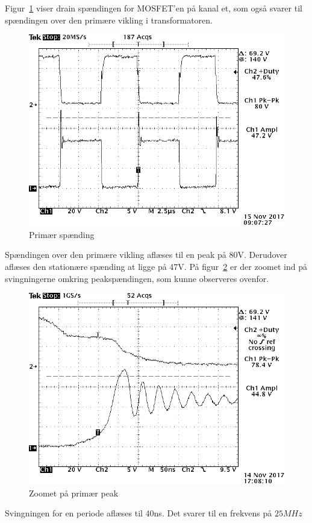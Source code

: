 Figur~\ref{fig: privolt} viser drain spændingen for MOSFET'en på kanal et, som også svarer til spændingen over den primære vikling i transformatoren.
\begin{figure}[H]
	\center
	\includegraphics[max width=0.7\linewidth]{../dokumentation/tex/2iteration/billeder/Realisering/Transformator_Primar.png}
	\caption{Primær spænding}
	\label{fig: privolt}
\end{figure}
Spændingen over den primære vikling aflæses til en peak på 80V. Derudover aflæses den stationære spænding at ligge på 47V. 
På figur~\ref{fig: prizoom} er der zoomet ind på svingningerne omkring peakspændingen, som kunne observeres ovenfor.
\begin{figure}[H]
	\center
	\includegraphics[max width=0.7\linewidth]{../dokumentation/tex/2iteration/billeder/Realisering/Transformator_Primarzoom.png}
	\caption{Zoomet på primær peak}
	\label{fig: prizoom}
\end{figure}
Svingningen for en periode aflæses til 40ns. Det svarer til en frekvens på $25MHz$

